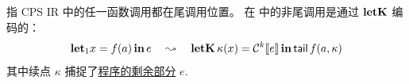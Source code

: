 \begin{remark}[尾调用保证] 指 CPS IR 中的任一函数调用都在尾调用位置。
  在 \Lambdair 中的非尾调用是通过 $\mathbf{letK}$ 编码的：
  \begingroup\setlength{\abovedisplayskip}{5pt}\setlength{\belowdisplayskip}{5pt}
  \begin{equation}
    \mathbf{let}_1 x = f(a)\, \mathbf{in}\, e
    \quad\leadsto\quad
    \mathbf{letK}\, \kappa(x) = \mathcal{C}^k\llbracket e \rrbracket\, \mathbf{in}\, \mathsf{tail}\, f(a, \kappa)
  \end{equation}
  \endgroup
  其中续点 $\kappa$ 捕捉了\underline{程序的剩余部分} $e$.
\end{remark}

